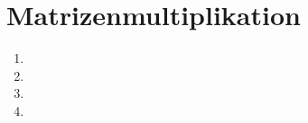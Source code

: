 \documentclass[a4paper,10pt]{scrartcl}
\begin{document}
\section{Matrizenmultiplikation}
\begin{enumerate}
\item 
\item 
\item 
\item 
\end{enumerate}
\end{document}
